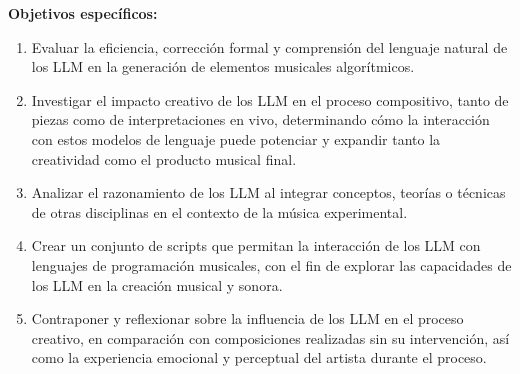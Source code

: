 \textbf{Objetivos específicos:}
\begin{enumerate}[label=\alph*)]
\item Evaluar la eficiencia, corrección formal y comprensión del lenguaje natural de los LLM en la generación de elementos musicales algorítmicos.
\item Investigar el impacto creativo de los LLM en el proceso compositivo, tanto de piezas como de interpretaciones en vivo, determinando cómo la interacción con estos modelos de lenguaje puede potenciar y expandir tanto la creatividad como el producto musical final.
\item Analizar el razonamiento de los LLM al integrar conceptos, teorías o técnicas de otras disciplinas en el contexto de la música experimental.
\item Crear un conjunto de scripts que permitan la interacción de los LLM con lenguajes de programación musicales, con el fin de explorar las capacidades de los LLM en la creación musical y sonora.
\item Contraponer y reflexionar sobre la influencia de los LLM en el proceso creativo, en comparación con composiciones realizadas sin su intervención, así como la experiencia emocional y perceptual del artista durante el proceso.
\end{enumerate}

